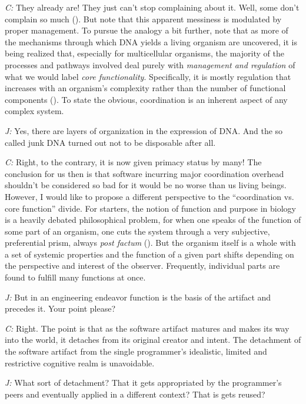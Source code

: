 \documentclass[10pt]{sigplanconf}
\begin{document}
\emph{C:} They already are! They just can't stop complaining about it. Well, some don't complain so much (\cite{noble1}). But note that this apparent messiness is modulated by proper management. To pursue the analogy a bit further, note that as more of the mechanisms through which DNA yields a living organism are uncovered, it is being realized that, especially for multicellular organisms, the majority of the processes and pathways involved deal purely with \emph{management and regulation} of what we would  label \emph{core functionality}. Specifically, it is mostly regulation that increases with an organism's complexity rather than the number of functional components (\cite{colinas}). To state the obvious, coordination is an inherent aspect of any complex system.

\emph{J:} Yes, there are layers of organization in the expression of DNA. And the so called junk DNA turned out not to be disposable after all.

\emph{C:} Right, to the contrary, it is now given primacy status by many! The conclusion for us then is that software incurring major coordination overhead shouldn't be considered so bad for it would be no worse than us living beings. However, I would like to propose a different perspective to the ``coordination vs. core function'' divide. For starters, the notion of function and purpose in biology is a heavily debated philosophical problem, for when one speaks of the function of some part of an organism, one cuts the system through a very subjective, preferential prism, always \emph{post factum} (\cite{lewens}). But the organism itself is a whole with a set of systemic properties and the function of a given part shifts depending on the perspective and interest of the observer. Frequently, individual parts are found to fulfill many functions at once.

\emph{J:} But in an engineering endeavor function is the basis of the artifact and precedes it. Your point please?

\emph{C:} Right. The point is that as the software artifact matures and makes its way into the world, it detaches from its original creator and intent. The detachment of the software artifact from the single programmer's idealistic, limited and restrictive cognitive realm is unavoidable.

\emph{J:} What sort of detachment? That it gets appropriated by the programmer's peers and eventually applied in a different context? That is gets reused?
\end{document}
